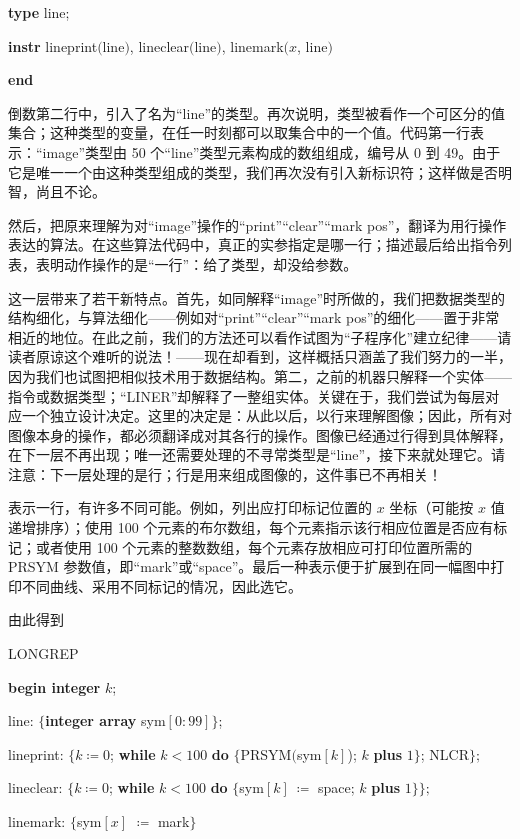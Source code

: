 \quad \textbf{type} line;

\quad \textbf{instr} lineprint$($line$)$, lineclear$($line$)$, linemark$(x$, line$)$

\textbf{end}

倒数第二行中，引入了名为“line”的类型。再次说明，类型被看作一个可区分的值集合；这种类型的变量，在任一时刻都可以取集合中的一个值。代码第一行表示：“image”类型由 50 个“line”类型元素构成的数组组成，编号从 0 到 49。由于它是唯一一个由这种类型组成的类型，我们再次没有引入新标识符；这样做是否明智，尚且不论。

然后，把原来理解为对“image”操作的“print”“clear”“mark pos”，翻译为用行操作表达的算法。在这些算法代码中，真正的实参指定是哪一行；描述最后给出指令列表，表明动作操作的是“一行”：给了类型，却没给参数。

这一层带来了若干新特点。首先，如同解释“image”时所做的，我们把数据类型的结构细化，与算法细化——例如对“print”“clear”“mark pos”的细化——置于非常相近的地位。在此之前，我们的方法还可以看作试图为“子程序化”建立纪律——请读者原谅这个难听的说法！——现在却看到，这样概括只涵盖了我们努力的一半，因为我们也试图把相似技术用于数据结构。第二，之前的机器只解释一个实体——指令或数据类型；“LINER”却解释了一整组实体。关键在于，我们尝试为每层对应一个独立设计决定。这里的决定是：从此以后，以行来理解图像；因此，所有对图像本身的操作，都必须翻译成对其各行的操作。图像已经通过行得到具体解释，在下一层不再出现；唯一还需要处理的不寻常类型是“line”，接下来就处理它。请注意：下一层处理的是行；行是用来组成图像的，这件事已不再相关！

表示一行，有许多不同可能。例如，列出应打印标记位置的 $x$ 坐标（可能按 $x$ 值递增排序）；使用 100 个元素的布尔数组，每个元素指示该行相应位置是否应有标记；或者使用 100 个元素的整数数组，每个元素存放相应可打印位置所需的 PRSYM 参数值，即“mark”或“space”。最后一种表示便于扩展到在同一幅图中打印不同曲线、采用不同标记的情况，因此选它。

由此得到

\noindent
LONGREP

\noindent
\textbf{begin integer} $k$;

\noindent
\quad line: $\{$\textbf{integer array} sym$[0 : 99]\}$;

\noindent
\quad lineprint: $\{k \coloneq 0$; \textbf{while} $k < 100$ \textbf{do} $\{$PRSYM$($sym$[k]$); $k$ \textbf{plus} $1\}$; NLCR$\};$

\noindent
\quad lineclear: $\{k \coloneq 0$; \textbf{while} $k < 100$ \textbf{do} $\{$sym$[k]\ \coloneq$ space; $k$ \textbf{plus} $1\}\};$

\noindent
\quad linemark: $\{$sym$[x]$ $\coloneq$ mark$\}$

